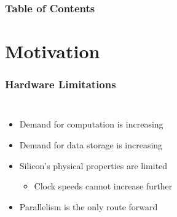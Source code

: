 \documentclass{beamer}
\title{}
\author{Clarity Shimoniak}
\institute[UCR]{University of California, Riverside}
\date{2025}
\begin{document}
\frame{\titlepage}

\begin{frame}
	\frametitle{Table of Contents}
	\tableofcontents
\end{frame}


\section{Motivation}

\begin{frame}
	\frametitle{Hardware Limitations}
	\begin{columns}
		\begin{itemize}
			\item Demand for computation is increasing
			\item Demand for data storage is increasing
			\item Silicon's physical properties are limited
			\begin{itemize}
				\item Clock speeds cannot increase further
			\end{itemize}
			\item Parallelism is the only route forward
		\end{itemize}

		\begin{figure}
			\centering
			
		\end{figure}
	\end{columns}
\end{frame}
\end{document}

